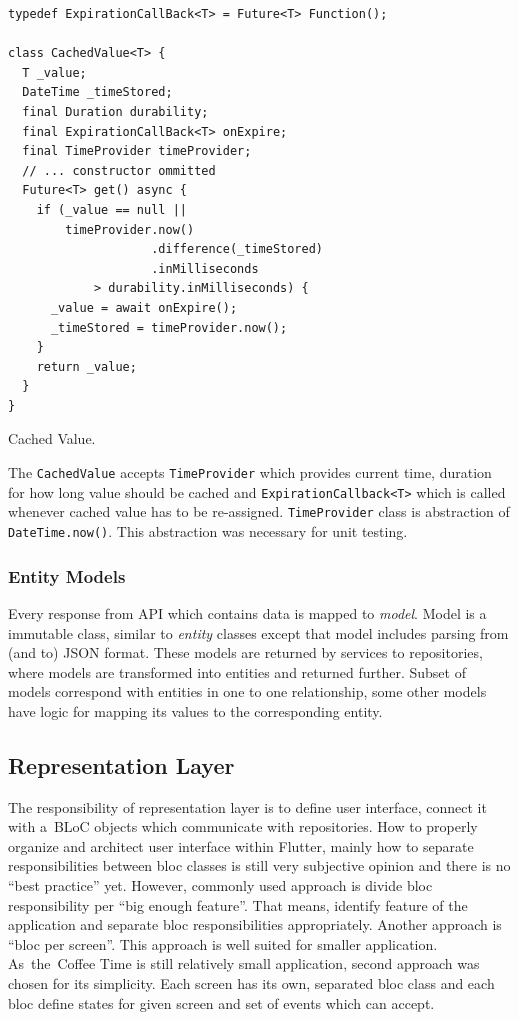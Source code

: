 \begin{listing}[ht]
\begin{verbatim}
typedef ExpirationCallBack<T> = Future<T> Function();

class CachedValue<T> {
  T _value;
  DateTime _timeStored;
  final Duration durability;
  final ExpirationCallBack<T> onExpire;
  final TimeProvider timeProvider;
  // ... constructor ommitted
  Future<T> get() async {
    if (_value == null ||
        timeProvider.now()
                    .difference(_timeStored)
                    .inMilliseconds 
            > durability.inMilliseconds) {
      _value = await onExpire();
      _timeStored = timeProvider.now();
    }
    return _value;
  }
}
\end{verbatim}
\caption{Cached Value.}
\label{listing:ct-cached-value}
\end{listing}

The \verb|CachedValue| accepts \verb|TimeProvider| which provides current time, duration for how long value should be cached and \verb|ExpirationCallback<T>| which is called whenever cached value has to be re-assigned. \verb|TimeProvider| class is abstraction of \verb|DateTime.now()|. This abstraction was necessary for unit testing.   

\subsubsection{Entity Models}
Every response from API which contains data is mapped to \textit{model}. Model is a immutable class, similar to \textit{entity} classes except that model includes parsing from (and to) JSON format. These models are returned by services to repositories, where models are transformed into entities and returned further. Subset of models correspond with entities in one to one relationship, some other models have logic for mapping its values to the corresponding entity. 
\subsection{Representation Layer}
The responsibility of representation layer is to define user interface, connect it with a~BLoC objects which communicate with repositories. How to properly organize and architect user interface within Flutter, mainly how to separate responsibilities between \gls{bloc} classes is still very subjective opinion and there is no ``best practice'' yet. However, commonly used approach is divide \gls{bloc} responsibility per ``big enough feature''. That means, identify feature of the application and separate \gls{bloc} responsibilities appropriately. Another approach is ``\gls{bloc} per screen''. This approach is well suited for smaller application. As~the~Coffee Time is still relatively small application, second approach was chosen for its simplicity. Each screen has its own, separated \gls{bloc} class and each \gls{bloc} define states for given screen and set of events which can accept.  

